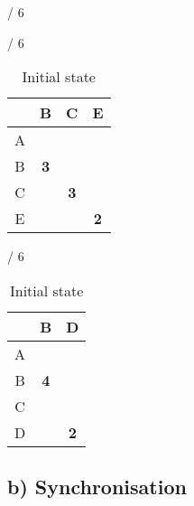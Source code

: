 \documentclass[a4paper, 11 pt, article, accentcolor=tud7b]{tudreport}
\begin{document}
\begin{table}[h]
\begin{subtable}[b]{\textwidth / 6}
	  \end{subtable}
    \hfill
	  \begin{subtable}[b]{\textwidth / 6}
	    \begin{tabular}{| c | c | c | c |}
	    \hline
	      & B & C & E \\ \hline
	    A &   &   &   \\ \hline
	    B & \textbf{3} &   &   \\ \hline
	    C &   & \textbf{3} &   \\ \hline
	    E &   &   & \textbf{2} \\ \hline
	    \end{tabular}
	    \caption{$D^{D}$}
	  \end{subtable}
	  \hfill
	  \begin{subtable}[b]{\textwidth / 6}
	    \begin{tabular}{| c | c | c |}
	    \hline
	      & B & D          \\ \hline
	    A &   &            \\ \hline
	    B & \textbf{4} &   \\ \hline
	    C &   &            \\ \hline
	    D &   & \textbf{2} \\ \hline
	    \end{tabular}
	    \caption{$D^{E}$}
	  \end{subtable}
	  \caption{Initial state}
	\end{table}
	
	\newpage
	
	\subsection*{b) Synchronisation}
	
\end{document}
